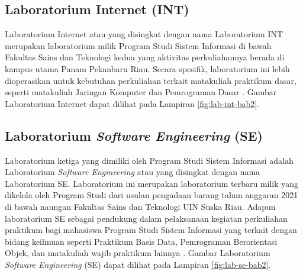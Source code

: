 
\subsection{Laboratorium Internet (INT)}
Laboratorium Internet atau yang disingkat dengan nama Laboratorium INT merupakan laboratorium milik Program Studi Sistem Informasi di bawah Fakultas Sains dan Teknologi kedua yang aktivitas perkuliahannya berada di kampus utama Panam Pekanbaru Riau. Secara spesifik, laboratorium ini lebih dioperasikan untuk kebutuhan perkuliahan terkait matakuliah praktikum dasar, seperti matakuliah Jaringan Komputer dan Pemrograman Dasar \cite{labsi2023}. Gambar Laboratorium Internet dapat dilihat pada Lampiran \ref{fig:lab-int-bab2}.


\subsection{Laboratorium \textit{Software Engineering} (SE)}
Laboratorium ketiga yang dimiliki oleh Program Studi Sistem Informasi adalah Laboratorium \textit{Software Engineering} atau yang disingkat dengan nama Laboratorium SE. Laboratorium ini merupakan laboratorium terbaru milik yang dikelola oleh Program Studi dari usulan pengadaan barang tahun anggaran 2021 di bawah naungan Fakultas Sains dan Teknologi UIN Suska Riau. Adapun laboratorium SE sebagai pendukung dalam pelaksanaan kegiatan perkuliahan praktikum bagi mahasiswa Program Studi Sistem Informasi yang terkait dengan bidang keilmuan seperti Praktikum Basis Data, Pemrograman Berorientasi Objek, dan matakuliah wajib praktikum lainnya \cite{labsi2023}. Gambar Laboratorium \textit{Software Engineering} (SE) dapat dilihat pada Lampiran \ref{fig:lab-se-bab2}.



